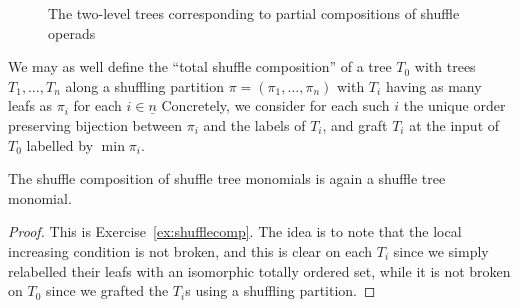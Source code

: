\begin{figure}

\caption{The two-level trees corresponding
 to partial compositions of shuffle operads}
 \label{fig:twolevel}
\end{figure}
We may as well define the ``total shuffle
composition'' of a tree $T_0$ with trees
$T_1,\ldots,T_n$ along a shuffling partition
$\pi = (\pi_1,\ldots,\pi_n)$ with $T_i$ having
as many leafs as $\pi_i$ for each $i\in \underline{n}$
Concretely, we consider for each such $i$
the unique order preserving bijection
between $\pi_i$ and the labels of $T_i$,
and graft $T_i$ at the input of $T_0$
labelled by $\min \pi_i$. 

\begin{proposition}
The shuffle composition of shuffle tree
monomials is again a shuffle tree
monomial.
\end{proposition} 

\begin{proof}
This is Exercise~\ref{ex:shufflecomp}. The
idea is to note that the local increasing
condition is not broken, and this is clear
on each $T_i$ since we simply relabelled their
leafs with an isomorphic totally ordered
set, 
while it is not broken on
$T_0$ since we grafted the $T_i$s using
a shuffling partition.
\end{proof}

